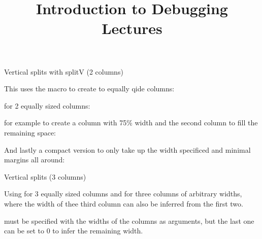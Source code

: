 \documentclass[11pt,compress,t,notes=noshow, xcolor=table]{beamer}
\title{Introduction to Debugging Lectures}
\begin{document}

\begin{vbframe}{Vertical splits with splitV (2 columns)}

This uses the  macro to create to equally qide columns:

 for 2 equally sized columns:

\vfill


\vfill

 for example to create a column with 75\% width and the
 second column to fill the remaining space:

\vfill


\vfill

And lastly a compact version  to only take up the width specificed and minimal margins all around:

\vfill


\vfill


\end{vbframe}

\begin{vbframe}{Vertical splits  (3 columns)}

Using  for 3 equally sized columns and  for three columns of 
arbitrary widths, where the width of thee third column can also be inferred from the first two.
\vfill


\vfill

 must be specified with the widths of the columns as arguments, but the last 
one can be set to 0 to infer the remaining width.

\vfill




\end{vbframe}
\end{document}
